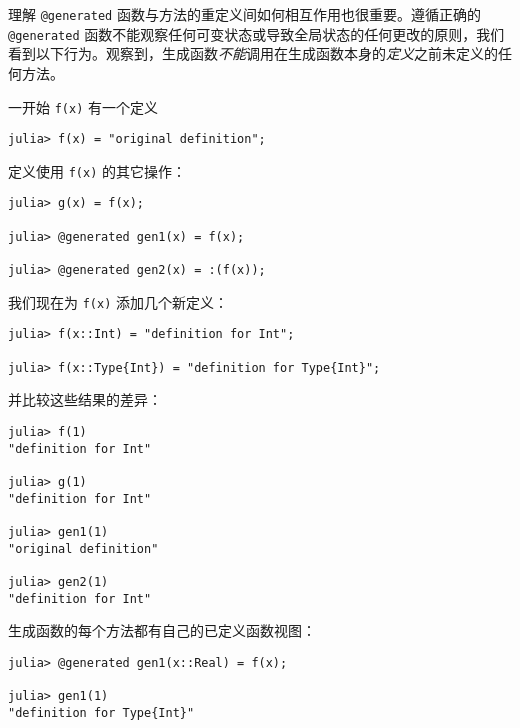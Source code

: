 理解 \texttt{@generated} 函数与方法的重定义间如何相互作用也很重要。遵循正确的 \texttt{@generated} 函数不能观察任何可变状态或导致全局状态的任何更改的原则，我们看到以下行为。观察到，生成函数\emph{不能}调用在生成函数本身的\emph{定义}之前未定义的任何方法。



一开始 \texttt{f(x)} 有一个定义




\begin{verbatim}
julia> f(x) = "original definition";
\end{verbatim}



定义使用 \texttt{f(x)} 的其它操作：




\begin{verbatim}
julia> g(x) = f(x);

julia> @generated gen1(x) = f(x);

julia> @generated gen2(x) = :(f(x));
\end{verbatim}



我们现在为 \texttt{f(x)} 添加几个新定义：




\begin{verbatim}
julia> f(x::Int) = "definition for Int";

julia> f(x::Type{Int}) = "definition for Type{Int}";
\end{verbatim}



并比较这些结果的差异：




\begin{verbatim}
julia> f(1)
"definition for Int"

julia> g(1)
"definition for Int"

julia> gen1(1)
"original definition"

julia> gen2(1)
"definition for Int"
\end{verbatim}



生成函数的每个方法都有自己的已定义函数视图：




\begin{verbatim}
julia> @generated gen1(x::Real) = f(x);

julia> gen1(1)
"definition for Type{Int}"
\end{verbatim}



